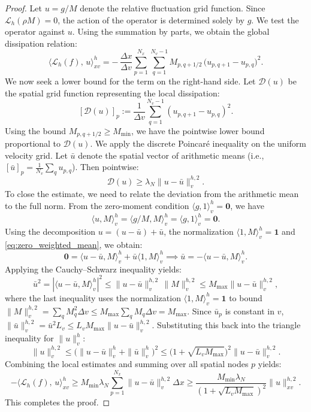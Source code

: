 \documentclass[]{article}
\numberwithin{equation}{section}
\begin{document}
\begin{proof}
Let $u = g/M$ denote the relative fluctuation grid function. Since $\mathcal{L}_{h}(\rho M) = 0$, the action of the operator is determined solely by $g$. We test the operator against $u$. Using the summation by parts, we obtain the global dissipation relation:
\[
\big\langle \mathcal L_{h}(f),\,u \big\rangle_{xv}^h
= -\,\frac{\Delta x}{\Delta v}\sum_{p=1}^{N_x}\sum_{q=1}^{N_v-1}
M_{p,q+1/2}\,\big( u_{p,q+1}-u_{p,q} \big)^2.
\]
We now seek a lower bound for the term on the right-hand side. Let $\mathcal{D}(u)$ be the spatial grid function representing the local dissipation:
\[
  [\mathcal{D}(u)]_p := \frac{1}{\Delta v} \sum_{q=1}^{N_v-1} (u_{p,q+1}-u_{p,q})^2.
\]
Using the bound $M_{p,q+1/2} \ge M_{\min}$, we have the pointwise lower bound proportional to $\mathcal{D}(u)$. We apply the discrete Poincaré inequality on the uniform velocity grid. Let $\bar{u}$ denote the spatial vector of arithmetic means (i.e., $[\bar{u}]_p = \frac{1}{N_v}\sum_q u_{p,q}$). Then pointwise:
\[
  \mathcal{D}(u) \ge \lambda_N \| u - \bar{u} \|_{v}^{h,2}.
\]
To close the estimate, we need to relate the deviation from the arithmetic mean to the full norm. From the zero-moment condition $\langle g,1\rangle_v^h=\mathbf{0}$, we have
\begin{equation}\label{eq:zero_weighted_mean}
    \langle u, M \rangle_v^h = \langle g/M, M \rangle_v^h = \langle g, 1 \rangle_v^h = \mathbf{0}.
\end{equation}
Using the decomposition $u = (u - \bar{u}) + \bar{u}$, the normalization $\langle 1, M \rangle_v^h = \mathbf{1}$ and \eqref{eq:zero_weighted_mean}, we obtain:
\[
  \mathbf{0} = \langle u - \bar{u}, M \rangle_v^h + \bar{u} \langle 1, M \rangle_v^h \implies \bar{u} = - \langle u - \bar{u}, M \rangle_v^h.
\]
Applying the Cauchy--Schwarz inequality yields:
\[
  \bar{u}^2 = |\langle u - \bar{u}, M \rangle_v^h|^2 \le \|u - \bar{u}\|_{v}^{h,2} \, \|M\|_{v}^{h,2} \le M_{\max} \|u - \bar{u}\|_{v}^{h,2},
\]
where the last inequality uses the normalization $\langle 1, M \rangle_v^h = \mathbf{1}$ to bound $\|M\|_{v}^{h,2} = \sum_q M_q^2 \Delta v \le M_{\max}\sum_q M_q \Delta v = M_{\max}$.  Since $\bar u_p$ is constant in $v$, $\|\bar{u}\|_{v}^{h,2} = \bar{u}^2 L_v \le L_v M_{\max}\|u-\bar u\|_v^{h,2}$.
Substituting this back into the triangle inequality for $\|u\|_v^h$:
\[
  \|u\|_{v}^{h,2} \le \Big( \|u-\bar{u}\|_v^h + \|\bar{u}\|_v^h \Big)^2 \le \Big(1 + \sqrt{L_v M_{\max}}\Big)^2 \|u-\bar{u}\|_{v}^{h,2}.
\]
Combining the local estimates and summing over all spatial nodes $p$ yields:
\[
  -\big\langle \mathcal L_{h}(f),\,u \big\rangle_{xv}^h \ge M_{\min} \lambda_N \sum_{p=1}^{N_x} \|u - \bar{u}\|_{v}^{h,2} \Delta x \ge \frac{M_{\min} \lambda_N}{(1+\sqrt{L_v M_{\max}})^2} \|u\|_{xv}^{h,2}.
\]
This completes the proof.
\end{proof}
\end{document}
